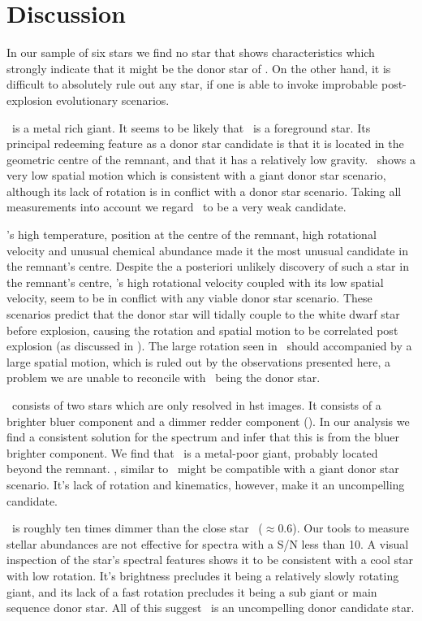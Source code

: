 \section{Discussion}
\label{sec:sn1572_hires:discussion}

In our sample of six stars we find no star that shows characteristics which strongly indicate that it might be the donor star of . On the other hand, it is difficult to absolutely rule out any star, if one is able to invoke improbable post-explosion evolutionary scenarios.

\stara\ is a metal rich giant. It seems to be likely that \stara\ is a foreground star. Its principal redeeming feature as a donor star candidate is that it is located in the geometric centre of the remnant, and that it has a relatively low gravity. \stara\ shows a very low spatial motion which is consistent with a giant donor star scenario, although its lack of rotation is in conflict with a donor star scenario. 
Taking all measurements into account we regard \stara\ to be a very weak candidate.

\starb's  high temperature, position at the centre of the remnant, high rotational velocity and unusual chemical abundance made it the most unusual candidate in the remnant's centre. Despite the a posteriori unlikely discovery of such a star in the remnant's centre, \starb's high rotational velocity coupled with its low spatial velocity, seem to be in conflict with any viable donor star scenario. 
These scenarios predict that the donor star will tidally couple to the white dwarf star before explosion, causing the rotation and spatial motion to be correlated post explosion (as discussed in \wek). The large rotation seen in \starb\ should accompanied by a large spatial motion, which is ruled out by the observations presented here, a problem we are unable to reconcile with \starb\ being the donor star. 

 \starc\ consists of two stars which are only resolved in \gls{hst} images. It consists of a brighter bluer component and a dimmer redder component (\rl). In our analysis we find a consistent solution for the spectrum and infer that this is from the bluer brighter component. 
We find that \starc\ is a metal-poor giant, probably located beyond the remnant. \starc, similar to \stara\ might be compatible with a giant donor star scenario. It's lack of rotation and kinematics, however, make it an uncompelling candidate.

\stard\ is roughly ten times dimmer than the close star \starc\ ($\approx 0.6$\arcsec). Our tools to measure stellar abundances are not effective for spectra with a S/N less than 10. A visual inspection of the star's spectral features shows it to be consistent with a cool star with low rotation. It's brightness precludes it being a relatively slowly rotating giant, and its lack of a fast rotation precludes it being a sub giant or main sequence donor star. All of this suggest \stard\ is an uncompelling donor candidate star. 

